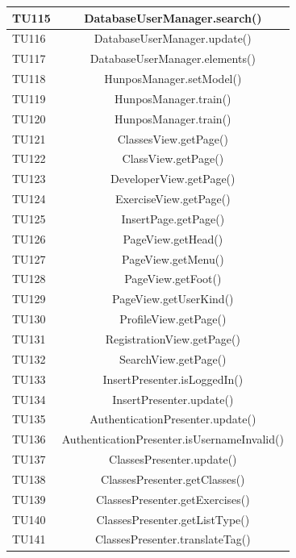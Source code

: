 \begin{longtable}{|>{\centering\arraybackslash}m{1.6cm}|c|}
		TU115 & DatabaseUserManager.search()  \\ \hline
		\rowcolor{LightGray}
		TU116 & DatabaseUserManager.update()  \\ \hline
		TU117 & DatabaseUserManager.elements()  \\ \hline
		\rowcolor{LightGray}
		TU118 & HunposManager.setModel()  \\ \hline
		TU119 & HunposManager.train()  \\ \hline
		\rowcolor{LightGray}
		TU120 & HunposManager.train()  \\ \hline
		TU121 & ClassesView.getPage()\\ \hline
		\rowcolor{LightGray}
		TU122 & ClassView.getPage()\\ \hline
		TU123 & DeveloperView.getPage()\\ \hline
		\rowcolor{LightGray}
		TU124 & ExerciseView.getPage()\\ \hline
		TU125 & InsertPage.getPage()\\ \hline
		\rowcolor{LightGray}
		TU126 & PageView.getHead()\\ \hline
		TU127 & PageView.getMenu() \\ \hline
		\rowcolor{LightGray}
		TU128 & PageView.getFoot()\\ \hline
		TU129 & PageView.getUserKind()\\ \hline
		\rowcolor{LightGray}
		TU130 & ProfileView.getPage()\\ \hline
		TU131 & RegistrationView.getPage()\\ \hline
		\rowcolor{LightGray}
		TU132 & SearchView.getPage()\\ \hline
		TU133 & InsertPresenter.isLoggedIn()  \\ \hline
		\rowcolor{LightGray}
		TU134 & InsertPresenter.update()  \\ \hline
		TU135 & AuthenticationPresenter.update() \\ \hline
		\rowcolor{LightGray}
		TU136 & AuthenticationPresenter.isUsernameInvalid()\\ \hline
		TU137 & ClassesPresenter.update()\\ \hline
		\rowcolor{LightGray}
		TU138 & ClassesPresenter.getClasses()\\ \hline
		TU139 & ClassesPresenter.getExercises()\\ \hline
		\rowcolor{LightGray}
		TU140 & ClassesPresenter.getListType()\\ \hline
		TU141 & ClassesPresenter.translateTag()\\ \hline

\end{longtable}
